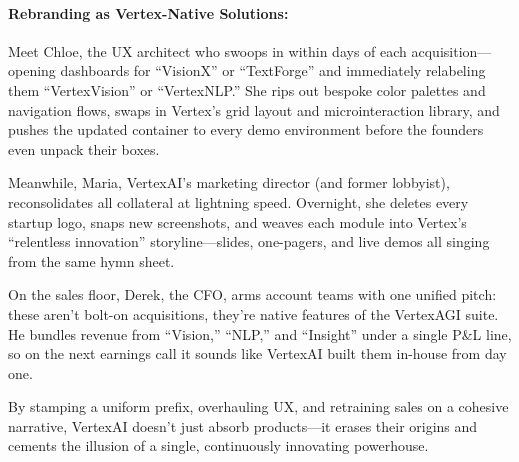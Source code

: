 \medskip


\paragraph{Rebranding as Vertex-Native Solutions:}
Meet Chloe, the UX architect who swoops in within days of each acquisition—opening dashboards for “VisionX” or 
“TextForge” and immediately relabeling them “VertexVision” or “VertexNLP.” She rips out bespoke color palettes and 
navigation flows, swaps in Vertex’s grid layout and microinteraction library, and pushes the updated container to 
every demo environment before the founders even unpack their boxes.

Meanwhile, Maria, VertexAI’s marketing director (and former lobbyist), reconsolidates all collateral at lightning speed. 
Overnight, she deletes every startup logo, snaps new screenshots, and weaves each module into Vertex’s 
“relentless innovation” storyline—slides, one-pagers, and live demos all singing from the same hymn sheet.

On the sales floor, Derek, the CFO, arms account teams with one unified pitch: these aren’t bolt-on acquisitions, 
they’re native features of the VertexAGI suite. He bundles revenue from “Vision,” “NLP,” and “Insight” under a 
single P\&L line, so on the next earnings call it sounds like VertexAI built them in-house from day one.

By stamping a uniform prefix, overhauling UX, and retraining sales on a cohesive narrative, VertexAI doesn’t 
just absorb products—it erases their origins and cements the illusion of a single, continuously innovating 
powerhouse.

\medskip

